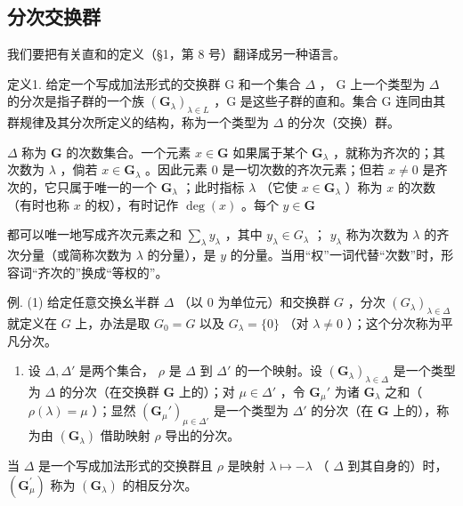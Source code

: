 \subsection{分次交换群}

我们要把有关直和的定义（§1，第 8 号）翻译成另一种语言。

定义1. 给定一个写成加法形式的交换群 G 和一个集合 \(\Delta\) ， G 上一个类型为 \(\Delta\) 的分次是指子群的一个族 \((\mathbf{G}_{\lambda})_{\lambda \in L}\) ，G 是这些子群的直和。集合 G 连同由其群规律及其分次所定义的结构，称为一个类型为 \(\Delta\) 的分次（交换）群。

\(\Delta\) 称为 \(\mathbf{G}\) 的次数集合。一个元素 \(x \in \mathbf{G}\) 如果属于某个 \(\mathbf{G}_{\lambda}\) ，就称为齐次的；其次数为 \(\lambda\) ，倘若 \(x \in \mathbf{G}_{\lambda}\) 。因此元素 0 是一切次数的齐次元素；但若 \(x \neq 0\) 是齐次的，它只属于唯一的一个 \(\mathbf{G}_{\lambda}\) ；此时指标 \(\lambda\) （它使 \(x \in \mathbf{G}_{\lambda}\) ）称为 \(x\) 的次数（有时也称 \(x\) 的权），有时记作 \(\deg(x)\) 。每个 \(y \in \mathbf{G}\)

都可以唯一地写成齐次元素之和 \(\sum_{\lambda} y_{\lambda}\) ，其中 \(y_{\lambda} \in G_{\lambda}\) ； \(y_{\lambda}\) 称为次数为 \(\lambda\) 的齐次分量（或简称次数为 \(\lambda\) 的分量），是 \(y\) 的分量。当用“权”一词代替“次数”时，形容词“齐次的”换成“等权的”。

例. (1) 给定任意交换幺半群 \(\Delta\) （以 0 为单位元）和交换群 \(G\) ，分次 \((G_{\lambda})_{\lambda \in \Delta}\) 就定义在 \(G\) 上，办法是取 \(G_0 = G\) 以及 \(G_{\lambda} = \{0\}\) （对 \(\lambda \neq 0\) ）；这个分次称为平凡分次。

\begin{enumerate}
\def\labelenumi{(\arabic{enumi})}
\setcounter{enumi}{1}
\tightlist
\item
  设 \(\Delta, \Delta'\) 是两个集合， \(\rho\) 是 \(\Delta\) 到 \(\Delta'\) 的一个映射。设 \((\mathbf{G}_{\lambda})_{\lambda \in \Delta}\) 是一个类型为 \(\Delta\) 的分次（在交换群 \(\mathbf{G}\) 上的）；对 \(\mu \in \Delta'\) ，令 \(\mathbf{G}_{\mu}'\) 为诸 \(\mathbf{G}_{\lambda}\) 之和（ \(\rho(\lambda) = \mu\) ）；显然 \((\mathbf{G}_{\mu}')_{\mu \in \Delta'}\) 是一个类型为 \(\Delta'\) 的分次（在 \(\mathbf{G}\) 上的），称为由 \((\mathbf{G}_{\lambda})\) 借助映射 \(\rho\) 导出的分次。
\end{enumerate}

当 \(\Delta\) 是一个写成加法形式的交换群且 \(\rho\) 是映射 \(\lambda \mapsto -\lambda\) （ \(\Delta\) 到其自身的）时， \((\mathbf{G}_{\mu}^{\prime})\) 称为 \((\mathbf{G}_{\lambda})\) 的相反分次。

